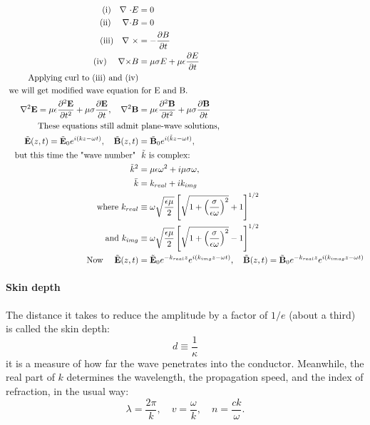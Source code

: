 \begin{align*}
\text{(i)\quad $\nabla$ $\cdot$} E&=0\\
\text{(ii) \quad $\nabla \cdot$} B&=0\\
\text{(iii)\quad $\nabla$ $\times$} &=-\frac{\partial B}{\partial t}\\
\text{(iv) \quad $\nabla \times$} B&=\mu \sigma E+\mu \epsilon \frac{\partial E}{\partial t}\\
\text{Applying curl to (iii) and (iv)}&\\
\text{ we will get modified wave equation}&\text{ for E and B.}\\
\nabla^{2} \mathbf{E}=\mu \epsilon \frac{\partial^{2} \mathbf{E}}{\partial t^{2}}+\mu \sigma \frac{\partial \mathbf{E}}{\partial t}, \quad \nabla^{2} \mathbf{B}&=\mu \epsilon \frac{\partial^{2} \mathbf{B}}{\partial t^{2}}+\mu \sigma \frac{\partial \mathbf{B}}{\partial t}\\
\text{These equations still admit}&\text{ plane-wave solutions,}\\
\tilde{\mathbf{E}}(z, t)=\tilde{\mathbf{E}}_{0} e^{i(k z-\omega t)}, \quad \tilde{\mathbf{B}}(z, t)&=\tilde{\mathbf{B}}_{0} e^{i(\tilde{k} z-\omega t)},\\
\text{but this time the "wave number" }&\text{ $\tilde{k}$ is complex:}\\
\tilde{k}^{2}&=\mu \epsilon \omega^{2}+i \mu \sigma \omega,\\
\bar{k}&=k_{real}+ik_{img}\\
\text{where }
k_{real} &\equiv \omega \sqrt{\frac{\epsilon \mu}{2}}\left[\sqrt{1+\left(\frac{\sigma}{\epsilon \omega}\right)^{2}}+1\right]^{1 / 2}\\
\text{and }
k_{img} &\equiv \omega \sqrt{\frac{\epsilon \mu}{2}}\left[\sqrt{1+\left(\frac{\sigma}{\epsilon \omega}\right)^{2}}-1\right]^{1 / 2}\\
\text{Now }\quad
\tilde{\mathbf{E}}(z, t)&=\tilde{\mathbf{E}}_{0} e^{-k_{real} z} e^{i(k_{img} z-\omega t)}, \quad \tilde{\mathbf{B}}(z, t)=\tilde{\mathbf{B}}_{0} e^{-k_{real}z} e^{i(k_{imag} z-\omega t)}
\end{align*}






\paragraph{Skin depth}
The distance it takes to reduce the amplitude by a factor of $1 / e$ (about a third) is called the skin depth:
$$
d \equiv \frac{1}{\kappa}
$$
it is a measure of how far the wave penetrates into the conductor. Meanwhile, the real part of $k$ determines the wavelength, the propagation speed, and the index of refraction, in the usual way:
$$
\lambda=\frac{2 \pi}{k}, \quad v=\frac{\omega}{k}, \quad n=\frac{c k}{\omega} .
$$

